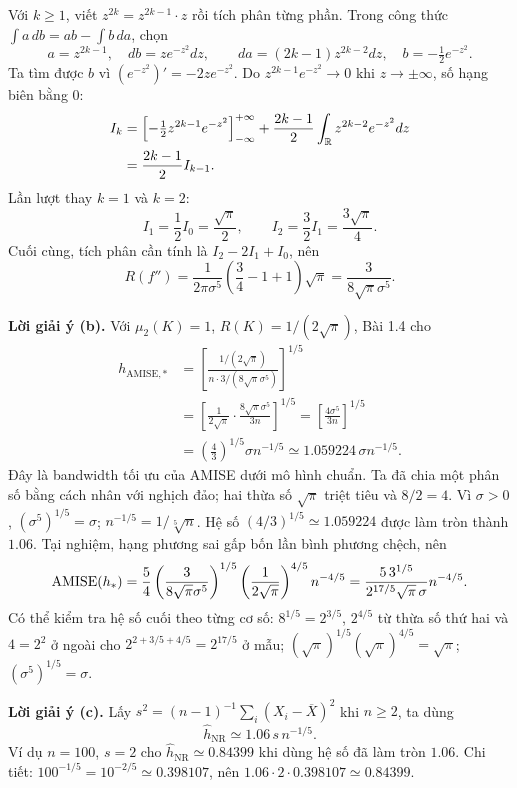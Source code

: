 Với $k\geq1$, viết $z^{2k}=z^{2k-1}\cdot z$ rồi tích phân từng phần.
Trong công thức $\int a\,db=ab-\int b\,da$, chọn
\[
a=z^{2k-1},\quad db=ze^{-z^2}dz,
\qquad da=(2k-1)z^{2k-2}dz,\quad b=-\tfrac12e^{-z^2}.
\]
Ta tìm được $b$ vì $(e^{-z^2})'=-2ze^{-z^2}$.
Do $z^{2k-1}e^{-z^2}\to0$ khi $z\to\pm\infty$, số hạng biên bằng 0:
\begin{align*}
I_k
&=\left[-\tfrac12z^{2k-1}e^{-z^2}\right]_{-\infty}^{+\infty}
 +\frac{2k-1}{2}\int_{\mathbb R}z^{2k-2}e^{-z^2}dz\\
&=\frac{2k-1}{2}I_{k-1}.
\end{align*}
Lần lượt thay $k=1$ và $k=2$:
\[
I_1=\frac12 I_0=\frac{\sqrt\pi}{2},\qquad
I_2=\frac32 I_1=\frac{3\sqrt\pi}{4}.
\]
Cuối cùng, tích phân cần tính là $I_2-2I_1+I_0$, nên
\[
\boxed{R(f'')=\frac{1}{2\pi\sigma^5}
\left(\frac34-1+1\right)\sqrt\pi
=\frac{3}{8\sqrt\pi\sigma^5}.}
\]

\textbf{Lời giải ý (b).}
Với $\mu_2(K)=1$, $R(K)=1/(2\sqrt\pi)$, Bài 1.4 cho
\begin{align*}
h_{\mathrm{AMISE},*}
&=\left[\frac{1/(2\sqrt\pi)}{n\cdot3/(8\sqrt\pi\sigma^5)}\right]^{1/5}\\
&=\left[\frac1{2\sqrt\pi}\cdot\frac{8\sqrt\pi\sigma^5}{3n}\right]^{1/5}
=\left[\frac{4\sigma^5}{3n}\right]^{1/5}\\
&=\left(\frac43\right)^{1/5}\sigma n^{-1/5}
\simeq1.059224\,\sigma n^{-1/5}.
\end{align*}
Đây là bandwidth tối ưu của AMISE dưới mô hình chuẩn.
Ta đã chia một phân số bằng cách nhân với nghịch đảo;
hai thừa số $\sqrt\pi$ triệt tiêu và $8/2=4$.
Vì $\sigma>0$, $(\sigma^5)^{1/5}=\sigma$;
$n^{-1/5}=1/\sqrt[5]{n}$. Hệ số $(4/3)^{1/5}\simeq1.059224$
được làm tròn thành $1.06$.
Tại nghiệm, hạng phương sai gấp bốn lần bình phương chệch, nên
\[
\operatorname{AMISE}(h_*)=\frac54
\left(\frac{3}{8\sqrt\pi\sigma^5}\right)^{1/5}
\left(\frac1{2\sqrt\pi}\right)^{4/5}n^{-4/5}
=\frac{5\,3^{1/5}}{2^{17/5}\sqrt\pi\,\sigma}n^{-4/5}.
\]
Có thể kiểm tra hệ số cuối theo từng cơ số:
$8^{1/5}=2^{3/5}$, $2^{4/5}$ từ thừa số thứ hai và $4=2^2$ ở ngoài
cho $2^{2+3/5+4/5}=2^{17/5}$ ở mẫu;
$(\sqrt\pi)^{1/5}(\sqrt\pi)^{4/5}=\sqrt\pi$;
$(\sigma^5)^{1/5}=\sigma$.

\textbf{Lời giải ý (c).}
Lấy $s^2=(n-1)^{-1}\sum_i(X_i-\overline X)^2$ khi $n\geq2$, ta dùng
\[
\boxed{\widehat h_{\mathrm{NR}}\simeq1.06\,s\,n^{-1/5}.}
\]
Ví dụ $n=100$, $s=2$ cho $\widehat h_{\mathrm{NR}}\simeq0.84399$
khi dùng hệ số đã làm tròn $1.06$.
Chi tiết: $100^{-1/5}=10^{-2/5}\simeq0.398107$,
nên $1.06\cdot2\cdot0.398107\simeq0.84399$.

